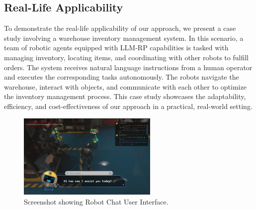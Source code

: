 \documentclass[pdflatex,sn-mathphys-num]{sn-jnl}%
\theoremstyle{thmstyleone}
\theoremstyle{thmstyletwo}%
\theoremstyle{thmstylethree}%
\begin{document}
\subsection*{Real-Life Applicability}
To demonstrate the real-life applicability of our approach, we present a case study involving a warehouse inventory management system. In this scenario, a team of robotic agents equipped with LLM-RP capabilities is tasked with managing inventory, locating items, and coordinating with other robots to fulfill orders. The system receives natural language instructions from a human operator and executes the corresponding tasks autonomously. The robots navigate the warehouse, interact with objects, and communicate with each other to optimize the inventory management process. This case study showcases the adaptability, efficiency, and cost-effectiveness of our approach in a practical, real-world setting.
\begin{figure}[h]
\centering
\includegraphics[width=0.6\textwidth]{figures/Picture9.png}
\caption{Screenshot showing Robot Chat User Interface.}\label{fig4}
\end{figure}
\end{document}
